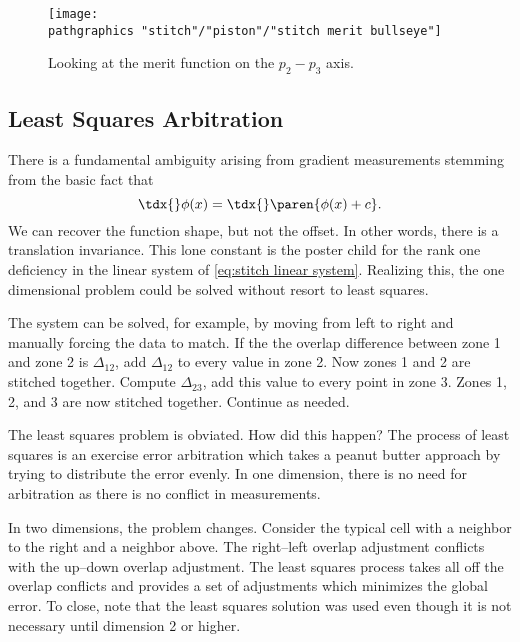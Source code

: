 \begin{figure}[htbp] %
   \centering
   \texttt{[image: \\pathgraphics "stitch"/"piston"/"stitch merit bullseye"]} 
   \caption{Looking at the merit function on the $p_{2} - p_{3}$ axis.}
   \label{fig:merit}
\end{figure}

\subsection{Least Squares Arbitration}  %
There is a fundamental ambiguity arising from gradient measurements stemming from the basic fact that
  \begin{equation*}   %
    \tdx{}\phi(x) = \tdx{}\paren{\phi(x) + c}.
  \end{equation*}
We can recover the function shape, but not the offset. In other words, there is a translation invariance. This lone constant is the poster child for the rank one deficiency in the linear system of \eqref{eq:stitch linear system}. Realizing this, the one dimensional problem could be solved without resort to least squares. 

The system can be solved, for example, by moving from left to right and manually forcing the data to match. If the the overlap difference between zone 1 and zone 2 is $\Delta_{12}$, add $\Delta_{12}$ to every value in zone 2. Now zones 1 and 2 are stitched together. Compute $\Delta_{23}$, add this value to every point in zone 3. Zones 1, 2, and 3 are now stitched together. Continue as needed.

The least squares problem is obviated. How did this happen? The process of least squares is an exercise error arbitration which takes a peanut butter approach by trying to distribute the error evenly. In one dimension, there is no need for arbitration as there is no conflict in measurements.

In two dimensions, the problem changes. Consider the typical cell with a neighbor to the right and a neighbor above. The right--left overlap adjustment conflicts with the up--down overlap adjustment. The least squares process takes all off the overlap conflicts and provides a set of adjustments which minimizes the global error. To close, note that the least squares solution was used even though it is not necessary until dimension 2 or higher.

